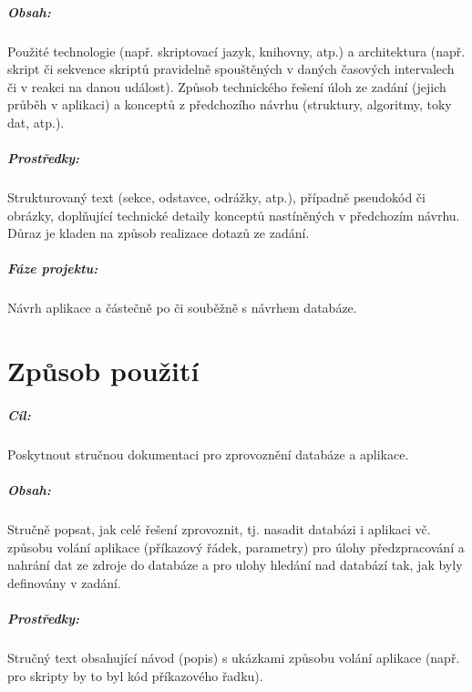 \documentclass[10pt,xcolor=pdflatex,dvipsnames,table,oneside]{book}
\begin{document}
\paragraph{Obsah:}
Použité technologie (např. skriptovací jazyk, knihovny, atp.)
a architektura (např. skript či sekvence skriptů pravidelně spouštěných v daných časových intervalech či v reakci na danou událost).
Způsob technického řešení úloh ze zadání (jejich průběh v aplikaci) a konceptů z předchozího návrhu (struktury, algoritmy, toky dat, atp.).

\paragraph{Prostředky:}
Strukturovaný text (sekce, odstavce, odrážky, atp.), případně pseudokód či obrázky, doplňující technické detaily konceptů nastíněných v předchozím návrhu.
Důraz je kladen na způsob realizace dotazů ze zadání.

\paragraph{Fáze projektu:}
Návrh aplikace a částečně po či souběžně s návrhem databáze.

\chapter{Způsob použití}

\paragraph{Cíl:}
Poskytnout stručnou dokumentaci pro zprovoznění databáze a aplikace.

\paragraph{Obsah:}
Stručně popsat, jak celé řešení zprovoznit, tj. nasadit databázi i aplikaci vč. způsobu volání aplikace (příkazový řádek, parametry) pro úlohy
předzpracování a nahrání dat ze zdroje do databáze a pro ulohy hledání nad databází tak, jak byly definovány v zadání.

\paragraph{Prostředky:}
Stručný text obsahující návod (popis) s ukázkami způsobu volání aplikace (např. pro skripty by to byl kód příkazového řadku).
\end{document}
